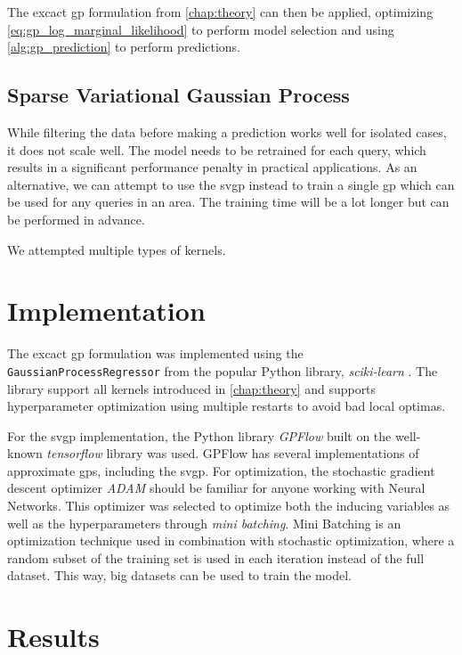 The excact \acrshort{gp} formulation from \cref{chap:theory} can then be applied, optimizing \cref{eq:gp_log_marginal_likelihood} to perform model selection and using \cref{alg:gp_prediction} to perform predictions. 

\subsection{Sparse Variational Gaussian Process}
While filtering the data before making a prediction works well for isolated cases, it does not scale well. The model needs to be retrained for each query, which results in a significant performance penalty in practical applications. As an alternative, we can attempt to use the \acrshort{svgp} instead to train a single \acrshort{gp} which can be used for any queries in an area. The training time will be a lot longer but can be performed in advance. 


We attempted multiple types of kernels. 

\section{Implementation}
The excact \acrshort{gp} formulation was implemented using the \texttt{GaussianProcessRegressor} from the popular Python library, \textit{sciki-learn} \cite{scikit-learn}. The library support all kernels introduced in \cref{chap:theory} and supports hyperparameter optimization using multiple restarts to avoid bad local optimas. 

For the \acrshort{svgp} implementation, the Python library \textit{GPFlow} \cite{GPflow2017} built on the well-known \textit{tensorflow} \cite{tensorflow2015-whitepaper} library was used. GPFlow has several implementations of approximate \acrshort{gp}s, including the \acrshort{svgp}. For optimization, the stochastic gradient descent optimizer \textit{ADAM} should be familiar for anyone working with Neural Networks. This optimizer was selected to optimize both the inducing variables as well as the hyperparameters through \textit{mini batching}. Mini Batching is an optimization technique used in combination with stochastic optimization, where a random subset of the training set is used in each iteration instead of the full dataset. This way, big datasets can be used to train the model.


\section{Results}


